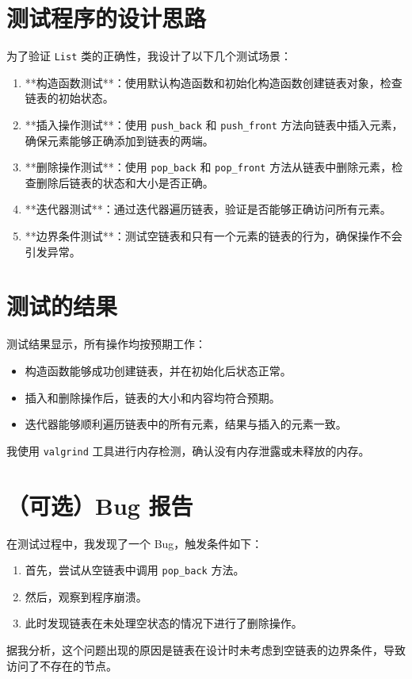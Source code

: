 \documentclass[UTF8]{ctexart}
\begin{document}
\pagestyle{fancy}
\fancyhead{}

\section{测试程序的设计思路}

为了验证 \texttt{List} 类的正确性，我设计了以下几个测试场景：

\begin{enumerate}[label=\arabic*.] %
    \item **构造函数测试**：使用默认构造函数和初始化构造函数创建链表对象，检查链表的初始状态。
    \item **插入操作测试**：使用 \texttt{push\_back} 和 \texttt{push\_front} 方法向链表中插入元素，确保元素能够正确添加到链表的两端。
    \item **删除操作测试**：使用 \texttt{pop\_back} 和 \texttt{pop\_front} 方法从链表中删除元素，检查删除后链表的状态和大小是否正确。
    \item **迭代器测试**：通过迭代器遍历链表，验证是否能够正确访问所有元素。
    \item **边界条件测试**：测试空链表和只有一个元素的链表的行为，确保操作不会引发异常。
\end{enumerate}

\section{测试的结果}

测试结果显示，所有操作均按预期工作：

\begin{itemize}
    \item 构造函数能够成功创建链表，并在初始化后状态正常。
    \item 插入和删除操作后，链表的大小和内容均符合预期。
    \item 迭代器能够顺利遍历链表中的所有元素，结果与插入的元素一致。
\end{itemize}

我使用 \texttt{valgrind} 工具进行内存检测，确认没有内存泄露或未释放的内存。

\section{（可选）Bug 报告}

在测试过程中，我发现了一个 Bug，触发条件如下：

\begin{enumerate}[label=\arabic*.]
    \item 首先，尝试从空链表中调用 \texttt{pop\_back} 方法。
    \item 然后，观察到程序崩溃。
    \item 此时发现链表在未处理空状态的情况下进行了删除操作。
\end{enumerate}

据我分析，这个问题出现的原因是链表在设计时未考虑到空链表的边界条件，导致访问了不存在的节点。
\end{document}
